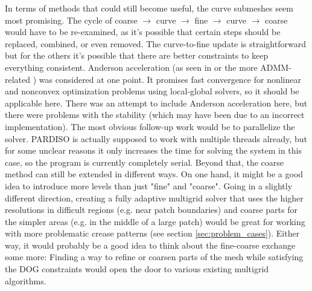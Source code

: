 \documentclass[a4paper,twoside,12pt,nochapterprefix]{scrbook}
\begin{document}
In terms of methods that could still become useful, the curve submeshes seem most promising. The cycle of coarse $\rightarrow$ curve $\rightarrow$ fine $\rightarrow$ curve $\rightarrow$ coarse would have to be re-examined, as it's possible that certain steps should be replaced, combined, or even removed. The curve-to-fine update is straightforward but for the others it's possible that there are better constraints to keep everything consistent.\newline
Anderson acceleration (as seen in \cite{Peng_2018} or the more ADMM-related \cite{Zhang_2019}) was considered at one point. It promises fast convergence for nonlinear and nonconvex optimization problems using local-global solvers, so it should be applicable here. There was an attempt to include Anderson acceleration here, but there were problems with the stability (which may have been due to an incorrect implementation).\newline
The most obvious follow-up work would be to parallelize the solver. PARDISO is actually supposed to work with multiple threads already, but for some unclear reasons it only increases the time for solving the system in this case, so the program is currently completely serial.\newline
Beyond that, the coarse method can still be extended in different ways. On one hand, it might be a good idea to introduce more levels than just "fine" and "coarse". Going in a slightly different direction, creating a fully adaptive multigrid solver that uses the higher resolutions in difficult regions  (e.g. near patch boundaries) and coarse parts for the simpler areas (e.g. in the middle of a large patch) would be great for working with more problematic crease patterns (see section \ref{sec:problem_cases}). Either way, it would probably be a good idea to think about the fine-coarse exchange some more: Finding a way to refine or coarsen parts of the mesh while satisfying the DOG constraints would open the door to various existing multigrid algorithms.\newline


\appendix
\cleardoublepage
{}
{}

%
\end{document}
